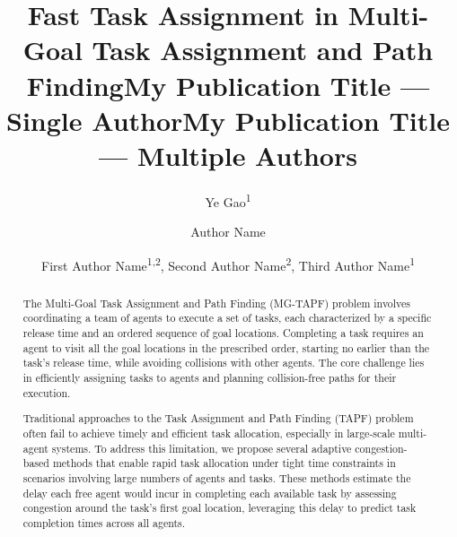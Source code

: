 \documentclass[letterpaper]{article} %
\title{Fast Task Assignment in Multi-Goal Task Assignment and Path Finding}
\author{
Ye Gao\textsuperscript{\rm 1}
}
\title{My Publication Title --- Single Author}
\author {
    Author Name
}
\title{My Publication Title --- Multiple Authors}
\author {
    First Author Name\textsuperscript{\rm 1,\rm 2},
    Second Author Name\textsuperscript{\rm 2},
    Third Author Name\textsuperscript{\rm 1}
}
\begin{document}
\maketitle

\begin{abstract}


The Multi-Goal Task Assignment and Path Finding (MG-TAPF) problem involves coordinating a team of agents to execute a set of tasks, each characterized by a specific release time and an ordered sequence of goal locations. 
Completing a task requires an agent to visit all the goal locations in the prescribed order, starting no earlier than the task's release time, while avoiding collisions with other agents. 
The core challenge lies in efficiently assigning tasks to agents and planning collision-free paths for their execution.  

Traditional approaches to the Task Assignment and Path Finding (TAPF) problem often fail to achieve timely and efficient task allocation, especially in large-scale multi-agent systems. 
To address this limitation, we propose several adaptive congestion-based methods that enable rapid task allocation under tight time constraints in scenarios involving large numbers of agents and tasks. 
These methods estimate the delay each free agent would incur in completing each available task by assessing congestion around the task’s first goal location, 
leveraging this delay to predict task completion times across all agents. 


\end{abstract}
\end{document}
